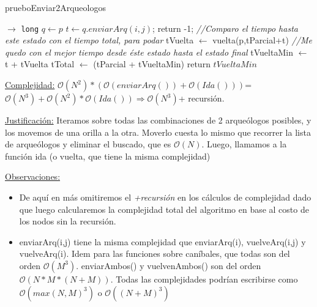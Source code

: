 \begin{algorithm}[H]
\caption{prueboEnviar2Arqueologos}
\begin{algorithmic}[1]
   $\to $ \texttt{long}
            \State $q \leftarrow p$
        	\State $t \leftarrow q.enviarArq(i,j)$;
        		\State	return -1;
        	\EndIf
        	\State \textit{//Comparo el tiempo hasta este estado con el tiempo total, para podar}
        		\State	tVuelta $\leftarrow$ vuelta(p,tParcial+t)
        		    \State \textit{//Me quedo con el mejor tiempo desde \'este estado hasta el estado final}
            		\State	tVueltaMin $\leftarrow$ t + tVuelta
            		\State  tTotal $\leftarrow$ (tParcial + tVueltaMin)
            	\EndIf
        	\EndIf
    	\EndFor
	\EndFor
	\State \State return $tVueltaMin$
 \EndProcedure
\end{algorithmic}
\underline{Complejidad:} 
$\mathcal{O}(N^2) * (\mathcal{O}(enviarArq()) + \mathcal{O}(Ida()))$= $\mathcal{O}(N^3) + \mathcal{O}(N^2)*\mathcal{O}(Ida())\Rightarrow \mathcal{O}(N^3)$+ recursión.

\vspace*{5mm}
\underline{Justificación:} Iteramos sobre todas las combinaciones de 2 arqueólogos posibles, y los movemos de una orilla a la otra. 
Moverlo cuesta lo mismo que recorrer la lista de arqueólogos y eliminar el buscado, que es $\mathcal{O}(N)$. 
Luego, llamamos a la función ida (o vuelta, que tiene la misma complejidad)
\end{algorithm}

\underline{Observaciones:} 
\begin{itemize}
    \item De aqu\'i en m\'as omitiremos el \textit{+recursi\'on} en los c\'alculos de complejidad dado que luego calcularemos la complejidad total del algoritmo en base al costo de los nodos sin la recursi\'on.
    \item enviarArq(i,j) tiene la misma complejidad que enviarArq(i), vuelveArq(i,j) y vuelveArq(i). Idem para las funciones sobre caníbales, que todas son del orden $\mathcal{O}(M^3)$. enviarAmbos() y vuelvenAmbos() son del orden $\mathcal{O}(N*M * (N+M))$. Todas las complejidades podrían escribirse como $\mathcal{O}({max(N,M)}^3)$ o $\mathcal{O}({(N + M)}^3)$ 
\end{itemize}

